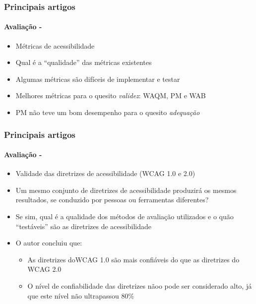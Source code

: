 \documentclass{beamer}
\begin{document}
\begin{frame}
\frametitle{Principais artigos}
\framesubtitle{Avaliação - \citet{Vigo:2011:AWA:1963660.1963798}}

\begin{itemize}
  \item Métricas de acessibilidade
  \item Qual é a ``qualidade'' das métricas existentes
  \item Algumas métricas são difíceis de implementar e testar
  \item Melhores métricas para o quesito \textit{validez}: WAQM, PM e WAB
  \item PM não teve um bom desempenho para o quesito \textit{adequação}
\end{itemize}

\end{frame}

\begin{frame}
\frametitle{Principais artigos}
\framesubtitle{Avaliação - \citet{Brajnik:2009:VRW:1639642.1639666}}

\begin{itemize}
  \item Validade das diretrizes de acessibilidade (WCAG 1.0 e 2.0)
  \item Um mesmo conjunto de diretrizes de acessibilidade produzirá os mesmos resultados, se conduzido por pessoas ou ferramentas diferentes?
  \item Se sim, qual é a qualidade dos métodos de avaliação utilizados e o quão ``testáveis'' são as diretrizes de acessibilidade
  \item O autor concluiu que:
  \begin{itemize}
    \item As diretrizes doWCAG 1.0 são mais confiáveis do que as diretrizes do WCAG 2.0
    \item O nível de confiabilidade das diretrizes nãoo pode ser considerado alto, já que este nível não ultrapassou 80\%
  \end{itemize}
\end{itemize}

\end{frame}
\end{document}
